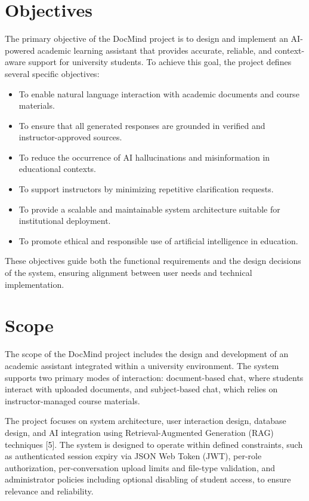 \documentclass[12pt, a4paper, oneside]{report}
\let\oldsection\section
\renewcommand{\section}{%
  \addtocontents{toc}{\protect\needspace{4\baselineskip}}%
  \oldsection
}
\begin{document}
\newpage

\section{Objectives}

The primary objective of the DocMind project is to design and implement an AI-powered academic learning assistant that provides accurate, reliable, and context-aware support for university students. To achieve this goal, the project defines several specific objectives:

\begin{itemize}
  \item To enable natural language interaction with academic documents and course materials.
  \item To ensure that all generated responses are grounded in verified and instructor-approved sources.
  \item To reduce the occurrence of AI hallucinations and misinformation in educational contexts.
  \item To support instructors by minimizing repetitive clarification requests.
  \item To provide a scalable and maintainable system architecture suitable for institutional deployment.
  \item To promote ethical and responsible use of artificial intelligence in education.
\end{itemize}

These objectives guide both the functional requirements and the design decisions of the system, ensuring alignment between user needs and technical implementation.

\section{Scope}

The scope of the DocMind project includes the design and development of an academic assistant integrated within a university environment. The system supports two primary modes of interaction: document-based chat, where students interact with uploaded documents, and subject-based chat, which relies on instructor-managed course materials.

The project focuses on system architecture, user interaction design, database design, and AI integration using Retrieval-Augmented Generation (RAG) techniques [5]. The system is designed to operate within defined constraints, such as authenticated session expiry via JSON Web Token (JWT), per-role authorization, per-conversation upload limits and file-type validation, and administrator policies including optional disabling of student access, to ensure relevance and reliability.
\end{document}
